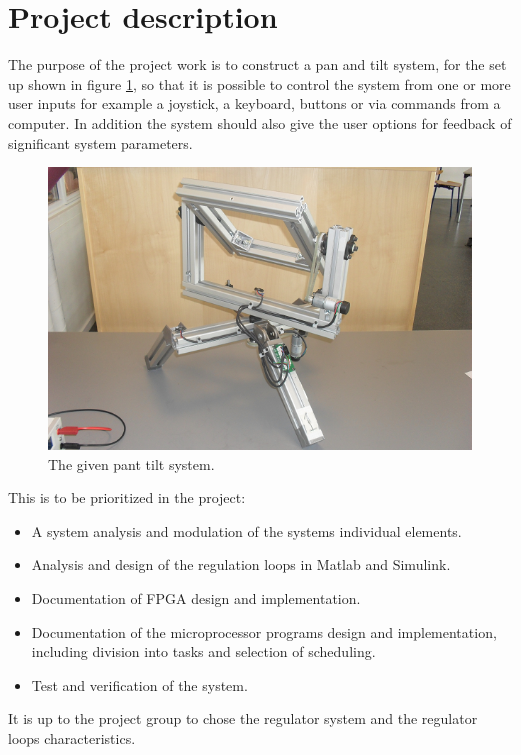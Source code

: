 
\section{Project description}
The purpose of the project work is to construct a pan and tilt system, for the set up shown in figure \ref{fig:pantilysystem}, so that it is possible to control the system from one or more user inputs for example a joystick, a keyboard, buttons or via commands from a computer. In addition the system should also give the user options for feedback of significant system parameters.

\begin{figure}[htb]
	\centering
	\includegraphics[width=\textwidth]{graphics/pantiltsystem.png} %
	\caption{The given pant tilt system.}
	\label{fig:pantilysystem}
\end{figure}

This is to be prioritized in the project:
\begin{itemize}
\item A system analysis and modulation of the systems individual elements.
\item Analysis and design of the regulation loops in Matlab and Simulink.
\item Documentation of FPGA design and implementation.
\item Documentation of the microprocessor programs design and implementation, including division into tasks and selection of scheduling.
\item Test and verification of the system.
\end{itemize}

It is up to the project group to chose the regulator system and the regulator loops characteristics.

